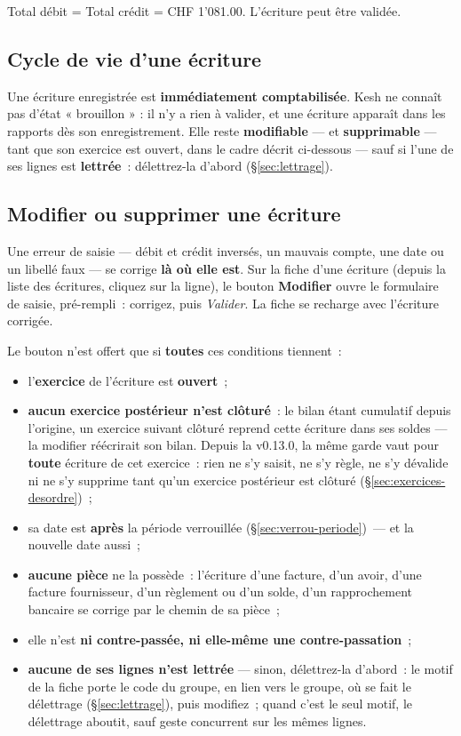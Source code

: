 \documentclass[a4paper,11pt,oneside]{article}
\begin{document}
Total débit = Total crédit = CHF 1'081.00. L'écriture peut être validée.

\subsection{Cycle de vie d'une écriture}

Une écriture enregistrée est \textbf{immédiatement comptabilisée}. Kesh ne connaît pas
d'état « brouillon » : il n'y a rien à valider, et une écriture apparaît dans les rapports
dès son enregistrement. Elle reste \textbf{modifiable} --- et \textbf{supprimable} ---
tant que son exercice est ouvert, dans le cadre décrit ci-dessous --- sauf si l'une de ses
lignes est \textbf{lettrée}~: délettrez-la d'abord (\S\ref{sec:lettrage}).

\subsection{Modifier ou supprimer une écriture}\label{sec:modifier-ecriture}

Une erreur de saisie --- débit et crédit inversés, un mauvais compte, une date ou un libellé
faux --- se corrige \textbf{là où elle est}. Sur la fiche d'une écriture (depuis la liste des
écritures, cliquez sur la ligne), le bouton \textbf{Modifier} ouvre le formulaire de saisie,
pré-rempli~: corrigez, puis \emph{Valider}. La fiche se recharge avec l'écriture corrigée.

Le bouton n'est offert que si \textbf{toutes} ces conditions tiennent~:

\begin{itemize}
    \item l'\textbf{exercice} de l'écriture est \textbf{ouvert}~;
    \item \textbf{aucun exercice postérieur n'est clôturé}~: le bilan étant cumulatif depuis
          l'origine, un exercice suivant clôturé reprend cette écriture dans ses soldes ---
          la modifier réécrirait son bilan. Depuis la v0.13.0, la même garde vaut pour
          \textbf{toute} écriture de cet exercice~: rien ne s'y saisit, ne s'y règle, ne s'y
          dévalide ni ne s'y supprime tant qu'un exercice postérieur est clôturé
          (\S\ref{sec:exercices-desordre})~;
    \item sa date est \textbf{après} la période verrouillée (\S\ref{sec:verrou-periode})~---
          et la nouvelle date aussi~;
    \item \textbf{aucune pièce} ne la possède~: l'écriture d'une facture, d'un avoir, d'une
          facture fournisseur, d'un règlement ou d'un solde, d'un rapprochement bancaire se
          corrige par le chemin de sa pièce~;
    \item elle n'est \textbf{ni contre-passée, ni elle-même une contre-passation}~;
    \item \textbf{aucune de ses lignes n'est lettrée} --- sinon, délettrez-la d'abord~: le
          motif de la fiche porte le code du groupe, en lien vers le groupe, où se fait le
          délettrage (\S\ref{sec:lettrage}), puis modifiez~; quand c'est le seul motif, le
          délettrage aboutit, sauf geste concurrent sur les mêmes lignes.
\end{itemize}
\end{document}
